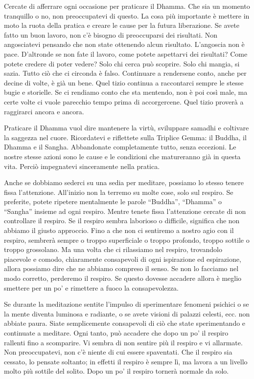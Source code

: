 Cercate di afferrare ogni occasione per praticare il Dhamma. Che sia un
momento tranquillo o no, non preoccupatevi di questo. La cosa più
importante è mettere in moto la ruota della pratica e creare le cause
per la futura liberazione. Se avete fatto un buon lavoro, non c'è
bisogno di preoccuparsi dei risultati. Non angosciatevi pensando che non
state ottenendo alcun risultato. L'angoscia non è pace. D'altronde se
non fate il lavoro, come potete aspettarvi dei risultati? Come potete
credere di poter vedere? Solo chi cerca può scoprire. Solo chi mangia,
si sazia. Tutto ciò che ci circonda è falso. Continuare a rendersene
conto, anche per decine di volte, è già un bene. Quel tizio continua a
raccontarci sempre le stesse bugie e storielle. Se ci rendiamo conto che
sta mentendo, non è poi così male, ma certe volte ci vuole parecchio
tempo prima di accorgercene. Quel tizio proverà a raggirarci ancora e
ancora.

Praticare il Dhamma vuol dire mantenere la virtù, sviluppare samadhi e
coltivare la saggezza nel cuore. Ricordatevi e riflettete sulla Triplice
Gemma: il Buddha, il Dhamma e il Sangha. Abbandonate completamente
tutto, senza eccezioni. Le nostre stesse azioni sono le cause e le
condizioni che matureranno già in questa vita. Perciò impegnatevi
sinceramente nella pratica.

Anche se dobbiamo sederci su una sedia per meditare, possiamo lo stesso
tenere fissa l'attenzione. All'inizio non la terremo su molte cose, solo
sul respiro. Se preferite, potete ripetere mentalmente le parole
``Buddha'', ``Dhamma'' o ``Sangha'' insieme ad ogni respiro. Mentre
tenete fissa l'attenzione cercate di non controllare il respiro. Se il
respiro sembra laborioso o difficile, significa che non abbiamo il
giusto approccio. Fino a che non ci sentiremo a nostro agio con il
respiro, sembrerà sempre o troppo superficiale o troppo profondo, troppo
sottile o troppo grossolano. Ma una volta che ci rilassiamo nel respiro,
trovandolo piacevole e comodo, chiaramente consapevoli di ogni
ispirazione ed espirazione, allora possiamo dire che ne abbiamo compreso
il senso. Se non lo facciamo nel modo corretto, perderemo il respiro. Se
questo dovesse accadere allora è meglio smettere per un po' e rimettere
a fuoco la consapevolezza.

Se durante la meditazione sentite l'impulso di sperimentare fenomeni
psichici o se la mente diventa luminosa e radiante, o se avete visioni
di palazzi celesti, ecc. non abbiate paura. Siate semplicemente
consapevoli di ciò che state sperimentando e continuate a meditare. Ogni
tanto, può accadere che dopo un po' il respiro rallenti fino a
scomparire. Vi sembra di non sentire più il respiro e vi allarmate. Non
preoccupatevi, non c'è niente di cui essere spaventati. Che il respiro
sia cessato, lo pensate soltanto; in effetti il respiro è sempre lì, ma
lavora a un livello molto più sottile del solito. Dopo un po' il respiro
tornerà normale da solo.

